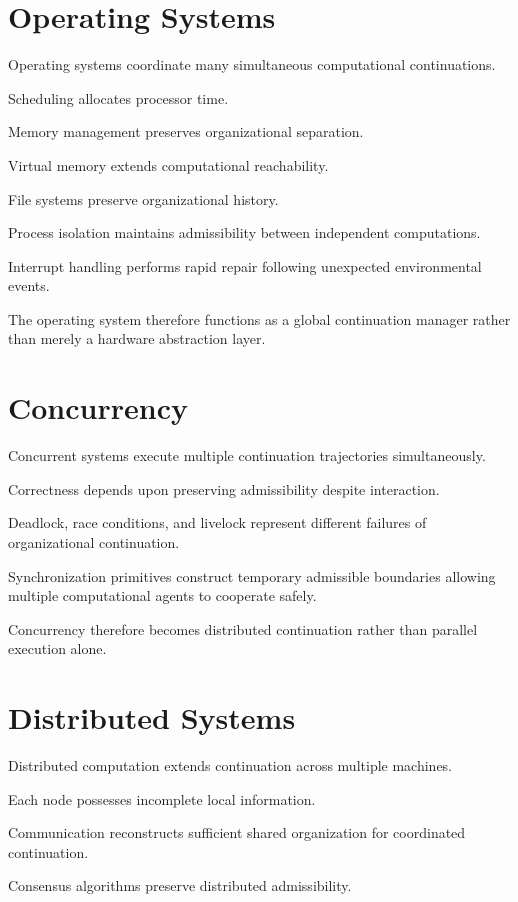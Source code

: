 \documentclass[11pt,oneside]{book}
\numberwithin{equation}{chapter}
\theoremstyle{definition}
\theoremstyle{plain}
\begin{document}
\section{Operating Systems}

Operating systems coordinate many simultaneous computational continuations.

Scheduling allocates processor time.

Memory management preserves organizational separation.

Virtual memory extends computational reachability.

File systems preserve organizational history.

Process isolation maintains admissibility between independent computations.

Interrupt handling performs rapid repair following unexpected environmental
events.

The operating system therefore functions as a global continuation manager
rather than merely a hardware abstraction layer.

\section{Concurrency}

Concurrent systems execute multiple continuation trajectories
simultaneously.

Correctness depends upon preserving admissibility despite interaction.

Deadlock, race conditions, and livelock represent different failures of
organizational continuation.

Synchronization primitives construct temporary admissible boundaries
allowing multiple computational agents to cooperate safely.

Concurrency therefore becomes distributed continuation rather than parallel
execution alone.

\section{Distributed Systems}

Distributed computation extends continuation across multiple machines.

Each node possesses incomplete local information.

Communication reconstructs sufficient shared organization for coordinated
continuation.

Consensus algorithms preserve distributed admissibility.
\end{document}
